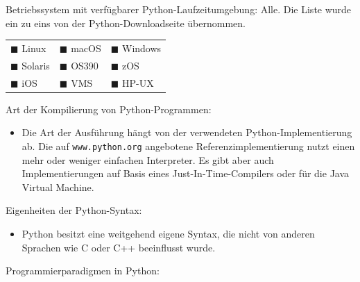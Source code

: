 \clearpage
\LoesungHeader

\teilaufgabe
Betriebssystem mit verfügbarer Python-Laufzeitumgebung: Alle. Die Liste wurde
ein zu eins von der Python-Downloadseite übernommen.

\begin{center}
    \begin{tabular}{p{}p{}p{}}
        $\blacksquare$ Linux &
        $\blacksquare$ macOS &
        $\blacksquare$ Windows \\

        $\blacksquare$ Solaris &
        $\blacksquare$ OS390 &
        $\blacksquare$ zOS \\

        $\blacksquare$ iOS &
        $\blacksquare$ VMS &
        $\blacksquare$ HP-UX \\
    \end{tabular}
\end{center}

\bigskip
\teilaufgabe
Art der Kompilierung von Python-Programmen:

\begin{itemize}
    \renewcommand{\labelitemi}{$\blacksquare$}
    \item Die Art der Ausführung hängt von der verwendeten Python-Implementierung
    ab. Die auf \texttt{www.python.org} angebotene Referenzimplementierung nutzt
    einen mehr oder weniger einfachen Interpreter. Es gibt aber auch Implementierungen
    auf Basis eines Just-In-Time-Compilers oder für die Java Virtual Machine.
\end{itemize}

\teilaufgabe
Eigenheiten der Python-Syntax:

\begin{itemize}
    \renewcommand{\labelitemi}{$\blacksquare$}
    \item Python besitzt eine weitgehend eigene Syntax, die nicht von anderen
    Sprachen wie C oder C++ beeinflusst wurde.
\end{itemize}

\teilaufgabe
Programmierparadigmen in Python:

